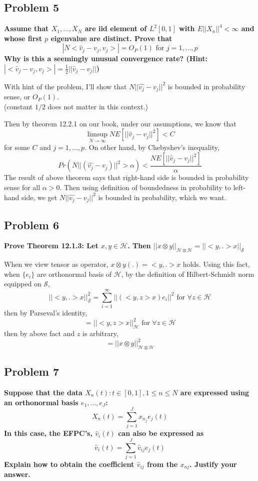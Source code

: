 \documentclass{article}
\begin{document}
\subsection{Problem 5}
\textbf{
Assume that $X_1,...,X_N$ are iid element of $L^2[0,1]$ with
$E||X_n||^4<\infty$ and whose first $p$ eigenvalue are distinct.
Prove that
\[|N<\hat{v}_j-v_j,v_j>|=O_P(1) \text{ for } j=1,...,p\]
Why is this a seemingly unusual convergence rate? 
(Hint: \(|<\hat{v}_j-v_j,v_j>|=\frac{1}{2}||\hat{v}_j-v_j||\))
}

With hint of the problem, I'll show that
\(N||\hat{v_j}-v_j||^2\) is bounded in probability sense, or $O_P(1)$.\\
(constant $1/2$ does not matter in this context.)

Then by theorem 12.2.1 on our book, under our assumptions, we know that
\[\limsup_{N\rightarrow \infty} NE[||\hat{v}_j-v_j||^2]<C\]
for some $C$ and $j=1,...,p$. 
On other hand, by Chebyshev's inequality,
\[Pr(N||(\hat{v_j}-v_j)||^2>\alpha)<\frac{NE[||\hat{v}_j-v_j||^2]}{\alpha}\]
The result of above theorem says that right-hand side is bounded in probability sense for all $\alpha>0$.
Then using definition of boundedness in probability to left-hand side,
we get \(N||\hat{v_j}-v_j||^2\) is bounded in probability, which we want.



\subsection{Problem 6}
\textbf{
Prove Theorem 12.1.3:
Let $x,y\in\mathcal{H}$. Then
\(||x\otimes y||_{\mathcal{H}\otimes\mathcal{H}}=
||<y,.>x||_{\mathcal{S}}\)
}

When we view tensor as operator, \(x\otimes y(.)=<y,.>x\) holds. 
Using this fact, when $\{e_i\}$ are orthonormal basis of $\mathcal{H}$,
by the definition of Hilbert-Schmidt norm equipped on $\mathcal{S}$,
\[||<y,.>x||^2_{\mathcal{S}}=\sum_{i=1}^{\infty}||(<y,z>x)e_i||^2 \text{ for } \forall z\in\mathcal{H}\]
then by Parseval's identity,
\[=||<y,z>x||^2_{\mathcal{H}} \text{ for } \forall z\in\mathcal{H}\]
then by above fact and $z$ is arbitrary,
\[=||x\otimes y||^2_{\mathcal{H}\otimes\mathcal{H}}\]


\subsection{Problem 7}
\textbf{
Suppose that the data ${X_n(t):t\in[0,1], 1\leq n\leq N}$
are expressed using an orthonormal basis $e_1,...,e_J$:
\[X_n(t)=\sum_{j=1}^J x_{n_j}e_j(t)\]
In this case, the EFPC's, $\hat{v}_i(t)$ can also be expressed as
\[\hat{v}_i(t)=\sum_{j=1}^J \hat{v}_{ij}e_j(t)\]
Explain how to obtain the coefficient $\hat{v}_{ij}$ from the $x_{nj}$. 
Justify your answer.
}
\end{document}
